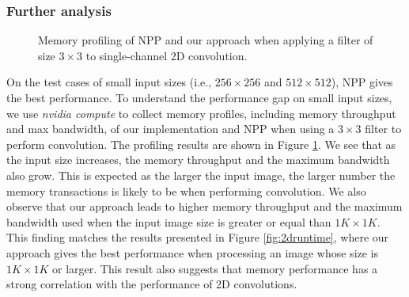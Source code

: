\subsubsection{Further analysis}
\begin{figure}[t!]
\centering

 \hspace{0em}

	
\caption{Memory profiling of NPP and our approach when applying  a filter of size $3 \times 3$ to single-channel 2D convolution.}
\label{fig:2dmemanaly}
\end{figure}

On the test cases of small input sizes (i.e., $256 \times 256$ and $512 \times 512$), NPP gives the best performance. To understand the
performance gap on small input sizes, we use \emph{nvidia compute} to collect memory profiles, including memory throughput and max
bandwidth, of our implementation and NPP when using a $3 \times 3$ filter to perform convolution. The profiling results are shown in Figure
\ref{fig:2dmemanaly}.  We see that as the input size increases, the memory throughput and the maximum bandwidth also grow. This is expected
as the larger the input image, the larger number the memory transactions is likely to be when performing convolution.  We also observe that
our approach leads to higher memory throughput and the maximum bandwidth used when the input image size is greater or equal than $1K \times
1K$. This finding matches the results presented in Figure \ref{fig:2druntime}, where our approach gives the best performance when
processing an image whose size is $1K \times 1K$ or larger. This result also suggests that memory performance has a strong correlation with
the performance of 2D convolutions.



